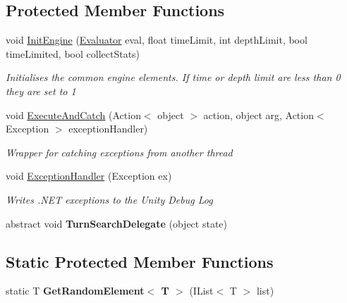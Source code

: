 \subsection*{Protected Member Functions}
\begin{DoxyCompactItemize}
\item 
void \hyperlink{class_universal_turn_based_a_i_1_1_turn_engine_a9b0c7d8f95391abd7d1840c2e9d0103f}{Init\+Engine} (\hyperlink{class_universal_turn_based_a_i_1_1_evaluator}{Evaluator} eval, float time\+Limit, int depth\+Limit, bool time\+Limited, bool collect\+Stats)
\begin{DoxyCompactList}\small\item\em Initialises the common engine elements. If time or depth limit are less than 0 they are set to 1 \end{DoxyCompactList}\item 
void \hyperlink{class_universal_turn_based_a_i_1_1_turn_engine_a7b14c450da986c60ebab0d992081371c}{Execute\+And\+Catch} (Action$<$ object $>$ action, object arg, Action$<$ Exception $>$ exception\+Handler)
\begin{DoxyCompactList}\small\item\em Wrapper for catching exceptions from another thread \end{DoxyCompactList}\item 
void \hyperlink{class_universal_turn_based_a_i_1_1_turn_engine_a1d1d7061052986196974028919d5c45f}{Exception\+Handler} (Exception ex)
\begin{DoxyCompactList}\small\item\em Writes .N\+E\+T exceptions to the Unity Debug Log \end{DoxyCompactList}\item 
\hypertarget{class_universal_turn_based_a_i_1_1_turn_engine_af34e85df941ad5c3cb3b1af7260752fe}{}abstract void {\bfseries Turn\+Search\+Delegate} (object state)\label{class_universal_turn_based_a_i_1_1_turn_engine_af34e85df941ad5c3cb3b1af7260752fe}

\end{DoxyCompactItemize}
\subsection*{Static Protected Member Functions}
\begin{DoxyCompactItemize}
\item 
\hypertarget{class_universal_turn_based_a_i_1_1_turn_engine_a2f0108600a38970fa4f8d46ac5919e3d}{}static T {\bfseries Get\+Random\+Element$<$ T $>$} (I\+List$<$ T $>$ list)\label{class_universal_turn_based_a_i_1_1_turn_engine_a2f0108600a38970fa4f8d46ac5919e3d}

\end{DoxyCompactItemize}
